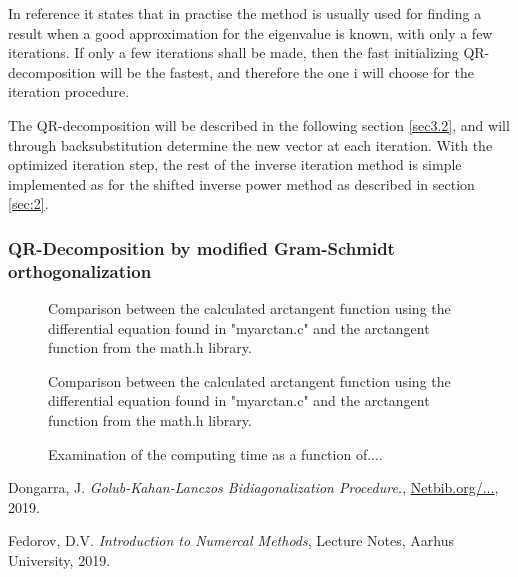 \documentclass[twocolumn]{article}
\begin{document}
In reference \cite{Dmi} it states that in practise the method is usually used for finding a result when a good approximation for the eigenvalue is known, with only a few iterations. If only a few iterations shall be made, then the fast initializing QR-decomposition will be the fastest, and therefore the one i will choose for the iteration procedure. 

The QR-decomposition will be described in the following section \ref{sec3.2}, and will through backsubstitution determine the new vector at each iteration. With the optimized iteration step, the rest of the inverse iteration method is simple implemented as for the shifted inverse power method as described in section \ref{sec:2}.

\subsubsection{\label{sec:3.2}QR-Decomposition by modified Gram-Schmidt orthogonalization}
 
 




  \begin{figure}[h]

\caption{Comparison between the calculated arctangent function using the differential equation found in "myarctan.c" and the arctangent function from the math.h library.}
\label{fig-atan}
\end{figure}

  \begin{figure}[h]

\caption{Comparison between the calculated arctangent function using the differential equation found in "myarctan.c" and the arctangent function from the math.h library.}
\label{fig-atan}
\end{figure}


\begin{figure}[h]

\caption{Examination of the computing time as a function of....}
\label{fig-atan}
\end{figure}

\begin{thebibliography}{9}

  Dongarra, J.
  \textit{Golub-Kahan-Lanczos Bidiagonalization Procedure.},
  \href{http://www.netlib.org/utk/people/JackDongarra/etemplates/node198.html}{Netbib.org/...},
  2019.
  
  Fedorov, D.V.
  \textit{Introduction to Numercal Methods},
  Lecture Notes, Aarhus University,
  2019.


\end{thebibliography}
\end{document}
